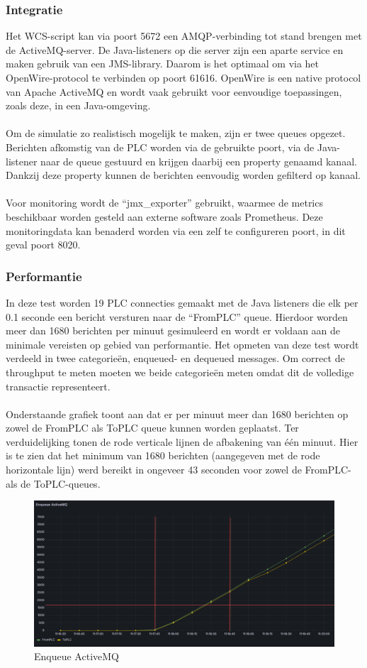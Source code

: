 \subsubsection{Integratie}
Het WCS-script kan via poort 5672 een AMQP-verbinding tot stand brengen met de ActiveMQ-server.
De Java-listeners op die server zijn een aparte service en maken gebruik van een JMS-library. 
Daarom is het optimaal om via het OpenWire-protocol te verbinden op poort 61616. 
OpenWire is een native protocol van Apache ActiveMQ en wordt vaak gebruikt voor eenvoudige toepassingen, zoals deze, in een Java-omgeving.
\\\\
Om de simulatie zo realistisch mogelijk te maken, zijn er twee queues opgezet. 
Berichten afkomstig van de PLC worden via de gebruikte poort, via de Java-listener naar de queue gestuurd en krijgen daarbij een property genaamd kanaal.
Dankzij deze property kunnen de berichten eenvoudig worden gefilterd op kanaal. 
\\\\
Voor monitoring wordt de ``jmx\_exporter'' gebruikt, waarmee de metrics beschikbaar worden gesteld aan externe software zoals Prometheus. 
Deze monitoringdata kan benaderd worden via een zelf te configureren poort, in dit geval poort 8020.

\subsubsection{Performantie}
In deze test worden 19 PLC connecties gemaakt met de Java listeners die elk per 0.1 seconde een bericht versturen naar de  ``FromPLC'' queue.
Hierdoor worden meer dan 1680 berichten per minuut gesimuleerd en wordt er voldaan aan de minimale vereisten op gebied van performantie.
Het opmeten van deze test wordt verdeeld in twee categorieën, enqueued- en dequeued messages.
Om correct de throughput te meten moeten we beide categorieën meten omdat dit de volledige transactie representeert. 
\\\\
Onderstaande grafiek toont aan dat er per minuut meer dan 1680 berichten op zowel de FromPLC als ToPLC queue kunnen worden geplaatst.
Ter verduidelijking tonen de rode verticale lijnen de afbakening van één minuut.
Hier is te zien dat het minimum van 1680 berichten (aangegeven met de rode horizontale lijn) werd bereikt in ongeveer 43 seconden voor zowel de FromPLC- als de ToPLC-queues.
\begin{figure}[h!]
  \centering
  \includegraphics[width=.80\textwidth]{img/amq-enqueue-count.png}
  \caption{\label{fig:amq_enqueue_count}Enqueue ActiveMQ}
\end{figure}
\newpage


